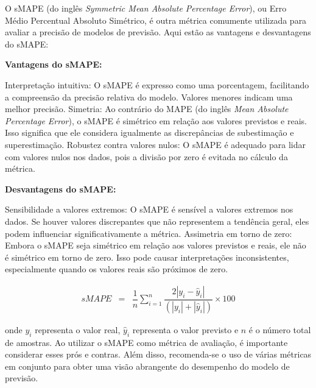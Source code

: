 O sMAPE (do inglês \textit{Symmetric Mean Absolute Percentage Error}), ou Erro Médio Percentual Absoluto Simétrico, é outra métrica comumente utilizada para avaliar a precisão de modelos de previsão. Aqui estão as vantagens e desvantagens do sMAPE:

\noindent\textbf{Vantagens do sMAPE:}


Interpretação intuitiva: O sMAPE é expresso como uma porcentagem, facilitando a compreensão da precisão relativa do modelo. Valores menores indicam uma melhor precisão.	
Simetria: Ao contrário do MAPE (do inglês \textit{Mean Absolute Percentage Error}), o sMAPE é simétrico em relação aos valores previstos e reais. Isso significa que ele considera igualmente as discrepâncias de subestimação e superestimação.	
Robustez contra valores nulos: O sMAPE é adequado para lidar com valores nulos nos dados, pois a divisão por zero é evitada no cálculo da métrica.


\noindent\textbf{Desvantagens do sMAPE:}


Sensibilidade a valores extremos: O sMAPE é sensível a valores extremos nos dados. Se houver valores discrepantes que não representem a tendência geral, eles podem influenciar significativamente a métrica.	
Assimetria em torno de zero: Embora o sMAPE seja simétrico em relação aos valores previstos e reais, ele não é simétrico em torno de zero. Isso pode causar interpretações inconsistentes, especialmente quando os valores reais são próximos de zero.



\begin{eqnarray}
	sMAPE &=& \dfrac{1}{n} \sum_{i=1}^{n} \dfrac{2|y_i - \hat{y}_i|}{(|y_i| + |\hat{y}_i|)} \times 100\label{eq:smape}
\end{eqnarray}


\noindent onde $y_i$ representa o valor real, $\hat{y}_i$ representa o valor previsto e $n$ é o número total de amostras.
Ao utilizar o sMAPE como métrica de avaliação, é importante considerar esses prós e contras. Além disso, recomenda-se o uso de várias métricas em conjunto para obter uma visão abrangente do desempenho do modelo de previsão.




